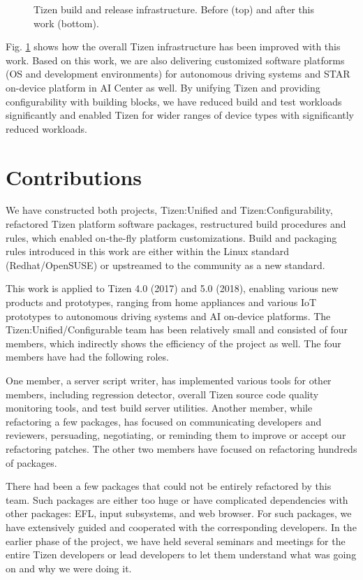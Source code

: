 \begin{figure}
\label{FIG_TZN_BR_INF}
\caption{Tizen build and release infrastructure. Before (top) and after this work (bottom).}
\end{figure}

Fig. \ref{FIG_TZN_BR_INF} shows how the overall Tizen infrastructure has been improved with this work. Based on this work, we are also delivering customized software platforms (OS and development environments) for autonomous driving systems and STAR on-device platform in AI Center as well.
By unifying Tizen and providing configurability with building blocks, we have reduced build and test workloads significantly and enabled Tizen for wider ranges of device types with significantly reduced workloads.







\section{Contributions}

We have constructed both projects, Tizen:Unified and Tizen:Configurability, refactored Tizen platform software packages, restructured build procedures and rules, which enabled on-the-fly platform customizations. Build and packaging rules introduced in this work are either within the Linux standard (Redhat/OpenSUSE) or upstreamed to the community as a new standard. 


This work is applied to Tizen 4.0 (2017) and 5.0 (2018), enabling various new products and prototypes, ranging from home appliances and various IoT prototypes to autonomous driving systems and AI on-device platforms. The Tizen:Unified/Configurable team has been relatively small and consisted of four members, which indirectly shows the efficiency of the project as well. The four members have had the following roles.


One member, a server script writer, has implemented various tools for other members, including regression detector, overall Tizen source code quality monitoring tools, and test build server utilities. Another member, while refactoring a few packages, has focused on communicating developers and reviewers, persuading, negotiating, or reminding them to improve or accept our refactoring patches. The other two members have focused on refactoring hundreds of packages.


There had been a few packages that could not be entirely refactored by this team. Such packages are either too huge or have complicated dependencies with other packages: EFL, input subsystems, and web browser. For such packages, we have extensively guided and cooperated with the corresponding developers. In the earlier phase of the project, we have held several seminars and meetings for the entire Tizen developers or lead developers to let them understand what was going on and why we were doing it.



